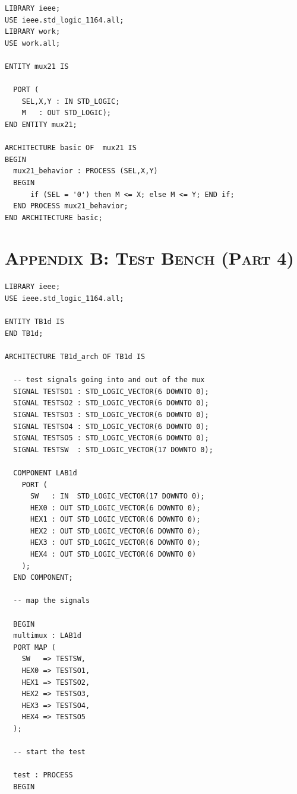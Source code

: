 \documentclass[11pt]{report}
\begin{document}
\begin{spacing}{1.5}
\begin{lstlisting}
LIBRARY ieee;
USE ieee.std_logic_1164.all;
LIBRARY work;
USE work.all;

ENTITY mux21 IS 

  PORT (
    SEL,X,Y : IN STD_LOGIC;
    M   : OUT STD_LOGIC);
END ENTITY mux21;

ARCHITECTURE basic OF  mux21 IS
BEGIN
  mux21_behavior : PROCESS (SEL,X,Y)
  BEGIN 
      if (SEL = '0') then M <= X; else M <= Y; END if;
  END PROCESS mux21_behavior;
END ARCHITECTURE basic;
\end{lstlisting}

\chapter*{\scshape Appendix B: Test Bench (Part 4)}
\label{app:b}

\vspace{45px}
\begin{lstlisting}
LIBRARY ieee;                                               
USE ieee.std_logic_1164.all;                                

ENTITY TB1d IS
END TB1d;

ARCHITECTURE TB1d_arch OF TB1d IS
     
  -- test signals going into and out of the mux                                                                                            
  SIGNAL TESTSO1 : STD_LOGIC_VECTOR(6 DOWNTO 0);
  SIGNAL TESTSO2 : STD_LOGIC_VECTOR(6 DOWNTO 0);
  SIGNAL TESTSO3 : STD_LOGIC_VECTOR(6 DOWNTO 0);
  SIGNAL TESTSO4 : STD_LOGIC_VECTOR(6 DOWNTO 0);
  SIGNAL TESTSO5 : STD_LOGIC_VECTOR(6 DOWNTO 0);
  SIGNAL TESTSW  : STD_LOGIC_VECTOR(17 DOWNTO 0);

  COMPONENT LAB1d
    PORT (
      SW   : IN  STD_LOGIC_VECTOR(17 DOWNTO 0);
      HEX0 : OUT STD_LOGIC_VECTOR(6 DOWNTO 0);
      HEX1 : OUT STD_LOGIC_VECTOR(6 DOWNTO 0);
      HEX2 : OUT STD_LOGIC_VECTOR(6 DOWNTO 0);
      HEX3 : OUT STD_LOGIC_VECTOR(6 DOWNTO 0);
      HEX4 : OUT STD_LOGIC_VECTOR(6 DOWNTO 0) 
    );
  END COMPONENT;

  -- map the signals

  BEGIN
  multimux : LAB1d
  PORT MAP (
    SW   => TESTSW,
    HEX0 => TESTSO1,
    HEX1 => TESTSO2,
    HEX2 => TESTSO3,
    HEX3 => TESTSO4,
    HEX4 => TESTSO5
  );

  -- start the test

  test : PROCESS                                                                                   
  BEGIN                                                         
  

\end{lstlisting}
\end{spacing}
\end{document}
